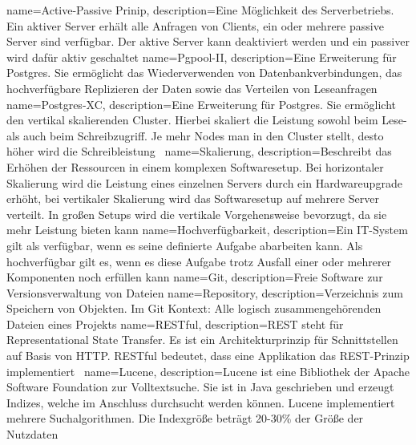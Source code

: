 {
  name=Active-Passive Prinip,
  description={Eine Möglichkeit des Serverbetriebs. Ein aktiver Server erhält
               alle Anfragen von Clients, ein oder mehrere passive Server sind
               verfügbar. Der aktive Server kann deaktiviert werden und ein
               passiver wird dafür aktiv geschaltet}
}
{
  name=Pgpool-II,
  description={Eine Erweiterung für Postgres. Sie ermöglicht das
               Wiederverwenden von Datenbankverbindungen, das hochverfügbare
               Replizieren der Daten sowie das Verteilen von
               Leseanfragen~\cite{pgpool}}
}
{
  name=Postgres-XC,
  description={Eine Erweiterung für Postgres. Sie ermöglicht den vertikal
               skalierenden Cluster. Hierbei skaliert die Leistung sowohl beim
               Lese- als auch beim Schreibzugriff. Je mehr Nodes man in den
               Cluster stellt, desto höher wird die
               Schreibleistung~\cite{postgres-xc}}
}
{
  name=Skalierung,
  description={Beschreibt das Erhöhen der Ressourcen in einem komplexen
               Softwaresetup. Bei horizontaler Skalierung wird die Leistung
               eines einzelnen Servers durch ein Hardwareupgrade erhöht,
               bei vertikaler Skalierung wird das Softwaresetup auf mehrere
               Server verteilt. In großen Setups wird die vertikale
               Vorgehensweise bevorzugt, da sie mehr Leistung bieten kann}
}
{
  name=Hochverfügbarkeit,
  description={Ein IT-System gilt als verfügbar, wenn es seine definierte
               Aufgabe abarbeiten kann. Als hochverfügbar gilt es, wenn es
               diese Aufgabe trotz Ausfall einer oder mehrerer Komponenten noch
               erfüllen kann}
}
{
  name=Git,
  description={Freie Software zur Versionsverwaltung von Dateien}
}
{
  name=Repository,
  description={Verzeichnis zum Speichern von Objekten. Im Git Kontext: Alle
               logisch zusammengehörenden Dateien eines Projekts}
}
{
  name=RESTful,
  description={REST steht für Representational State Transfer. Es ist ein
               Architekturprinzip für Schnittstellen auf Basis von HTTP.
               RESTful bedeutet, dass eine Applikation das REST-Prinzip
               implementiert~\cite{fielding2000architectural}}
}
{
  name=Lucene,
  description={Lucene ist eine Bibliothek der Apache Software Foundation zur
               Volltextsuche. Sie ist in Java geschrieben und erzeugt Indizes,
               welche im Anschluss durchsucht werden können. Lucene
               implementiert mehrere Suchalgorithmen. Die Indexgröße beträgt
               20-30\% der Größe der Nutzdaten~\cite{lucene_features}}
}
